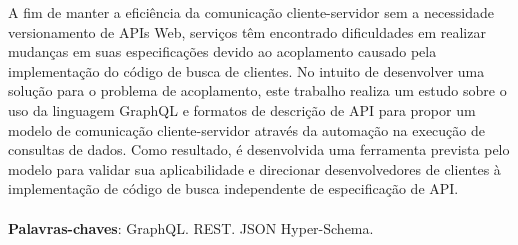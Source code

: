 \begin{resumo}
  A fim de manter a eficiência da comunicação cliente-servidor sem a necessidade versionamento de APIs Web, serviços têm encontrado dificuldades em realizar mudanças em suas especificações devido ao acoplamento causado pela implementação do código de busca de clientes. No intuito de desenvolver uma solução para o problema de acoplamento, este trabalho realiza um estudo sobre o uso da linguagem GraphQL e formatos de descrição de API para propor um modelo de comunicação cliente-servidor através da automação na execução de consultas de dados. Como resultado, é desenvolvida uma ferramenta prevista pelo modelo para validar sua aplicabilidade e direcionar desenvolvedores de clientes à implementação de código de busca independente de especificação de API. \\ \\
  \textbf{Palavras-chaves}: GraphQL. REST. JSON Hyper-Schema.
\end{resumo}
